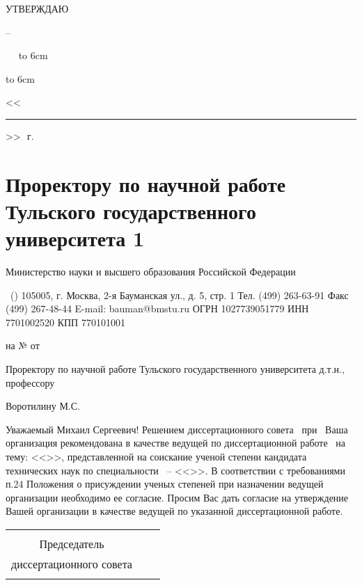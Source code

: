 
\hfill\parbox{6cm}{
	\centerline{УТВЕРЖДАЮ}
	\centerline{\leadingOrganizationHeadPos\---}
	\leadingOrganizationTitle
	
	\ktn~\leadingOrganizationHead\
	\linebreak
	{\hbox to 6cm{\hrulefill}}
	{\hbox to 6cm{<<\rule{7mm}{0.4pt}>>\hrulefill~\number\year\,г.}}}
\vspace{0.5cm}



\section{Проректору по научной работе Тульского государственного университета 1}

Министерство науки и высшего образования
Российской Федерации


\thesisOrganization\
(\thesisOrganizationShort)
105005, г. Москва, 2-я Бауманская ул., д. 5, стр. 1
Тел. (499) 263-63-91 Факс (499) 267-48-44
E-mail: bauman@bmstu.ru
ОГРН 1027739051779
ИНН 7701002520 КПП 770101001

на №	от	


Проректору по научной работе
Тульского государственного университета
д.т.н., профессору

Воротилину М.С.


Уважаемый Михаил Сергеевич!
Решением диссертационного совета \ при \thesisInOrganization\ Ваша организация рекомендована в качестве ведущей по диссертационной работе \thesisAuthorLastNameFromFull\ на тему: <<\thesisTitle>>, представленной на соискание ученой степени кандидата технических наук по специальности \thesisSpecialtyNumber\ -- <<\thesisSpecialtyTitle>>.
В соответствии с требованиями п.24 Положения о присуждении ученых степеней при назначении ведущей организации необходимо ее согласие.
Просим Вас дать согласие на утверждение Вашей организации в качестве ведущей по указанной диссертационной работе.



\begin{center}
	\begin{tabular}[c]{c m{4cm} l}
		                        &            &                     \\
		     Председатель       &            &                     \\
		диссертационного совета & \hrulefill & \dcHeadFullFIO      \\
		    \dcHeadRegalia      &            &                     \\
	\end{tabular}
\end{center}

\clearpage